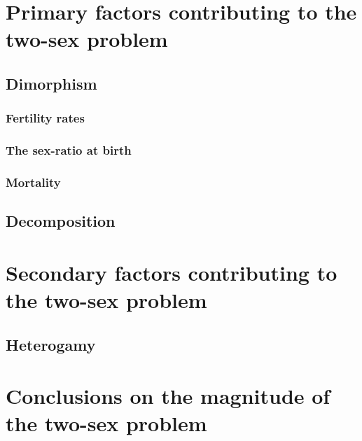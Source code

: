   \section{Primary factors contributing to the two-sex problem}

    \subsection{Dimorphism}
      
      
      \subsubsection{Fertility rates}
        
      
      \subsubsection{The sex-ratio at birth}
        
      
      \subsubsection{Mortality}
        
    
    \subsection{Decomposition}
      
    
  \section{Secondary factors contributing to the two-sex problem}
      
    \subsection{Heterogamy}
      
      
  \section{Conclusions on the magnitude of the two-sex problem}
      
